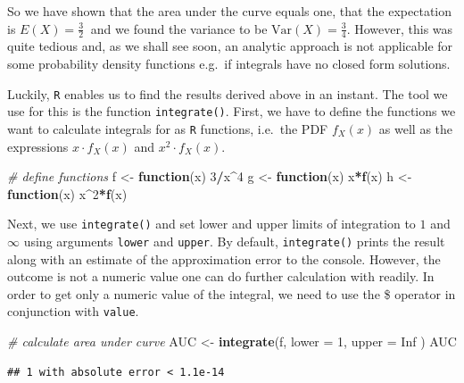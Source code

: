 \documentclass[]{book}
\newenvironment{Shaded}{\begin{snugshade}}{\end{snugshade}}
\newcommand{\KeywordTok}[1]{\textcolor[rgb]{0.13,0.29,0.53}{\textbf{#1}}}
\newcommand{\DataTypeTok}[1]{\textcolor[rgb]{0.13,0.29,0.53}{#1}}
\newcommand{\DecValTok}[1]{\textcolor[rgb]{0.00,0.00,0.81}{#1}}
\newcommand{\StringTok}[1]{\textcolor[rgb]{0.31,0.60,0.02}{#1}}
\newcommand{\CommentTok}[1]{\textcolor[rgb]{0.56,0.35,0.01}{\textit{#1}}}
\newcommand{\OtherTok}[1]{\textcolor[rgb]{0.56,0.35,0.01}{#1}}
\newcommand{\ControlFlowTok}[1]{\textcolor[rgb]{0.13,0.29,0.53}{\textbf{#1}}}
\newcommand{\OperatorTok}[1]{\textcolor[rgb]{0.81,0.36,0.00}{\textbf{#1}}}
\newcommand{\NormalTok}[1]{#1}
\theoremstyle{definition}
\theoremstyle{definition}
\theoremstyle{definition}
\theoremstyle{remark}
\begin{document}
So we have shown that the area under the curve equals one, that the
expectation is \(E(X)=\frac{3}{2} \ \) and we found the variance to be
\(\text{Var}(X) = \frac{3}{4}\). However, this was quite tedious and, as
we shall see soon, an analytic approach is not applicable for some
probability density functions e.g.~if integrals have no closed form
solutions.

Luckily, \texttt{R} enables us to find the results derived above in an
instant. The tool we use for this is the function \texttt{integrate()}.
First, we have to define the functions we want to calculate integrals
for as \texttt{R} functions, i.e.~the PDF \(f_X(x)\) as well as the
expressions \(x\cdot f_X(x)\) and \(x^2\cdot f_X(x)\).

\begin{Shaded}
\begin{Highlighting}[]
\CommentTok{# define functions}
\NormalTok{f <-}\StringTok{ }\ControlFlowTok{function}\NormalTok{(x) }\DecValTok{3}\OperatorTok{/}\NormalTok{x}\OperatorTok{^}\DecValTok{4}
\NormalTok{g <-}\StringTok{ }\ControlFlowTok{function}\NormalTok{(x) x}\OperatorTok{*}\KeywordTok{f}\NormalTok{(x)}
\NormalTok{h <-}\StringTok{ }\ControlFlowTok{function}\NormalTok{(x) x}\OperatorTok{^}\DecValTok{2}\OperatorTok{*}\KeywordTok{f}\NormalTok{(x)}
\end{Highlighting}
\end{Shaded}

Next, we use \texttt{integrate()} and set lower and upper limits of
integration to \(1\) and \(\infty\) using arguments \texttt{lower} and
\texttt{upper}. By default, \texttt{integrate()} prints the result along
with an estimate of the approximation error to the console. However, the
outcome is not a numeric value one can do further calculation with
readily. In order to get only a numeric value of the integral, we need
to use the \$ operator in conjunction with \texttt{value}.

\begin{Shaded}
\begin{Highlighting}[]
\CommentTok{# calculate area under curve}
\NormalTok{AUC <-}\StringTok{ }\KeywordTok{integrate}\NormalTok{(f, }
                 \DataTypeTok{lower =} \DecValTok{1}\NormalTok{, }
                 \DataTypeTok{upper =} \OtherTok{Inf}
\NormalTok{                 )}
\NormalTok{AUC }
\end{Highlighting}
\end{Shaded}

\begin{verbatim}
## 1 with absolute error < 1.1e-14
\end{verbatim}
\end{document}
